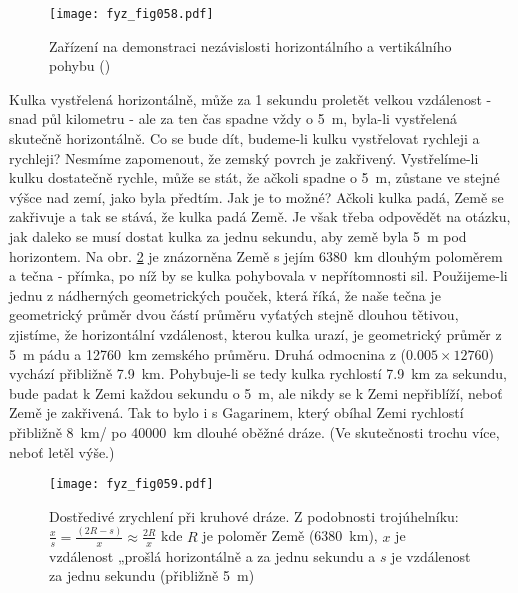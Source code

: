     \begin{figure}[ht!]  %
      \centering
      \texttt{[image: fyz\_fig058.pdf]}
      \caption{Zařízení na demonstraci nezávislosti horizontálního a vertikálního pohybu 
               (\cite[s.~96]{Feynman01})}
      \label{fyz:fig058}
    \end{figure}
    Kulka vystřelená horizontálně, může za \num{1} sekundu proletět velkou vzdálenost - snad půl 
    kilometru - ale za ten čas spadne vždy o \SI{5}{\m}, byla-li vystřelená skutečně horizontálně. 
    Co se bude dít, budeme-li kulku vystřelovat rychleji a rychleji? Nesmíme zapomenout, že zemský 
    povrch je zakřivený. Vystřelíme-li kulku dostatečně rychle, může se stát, že ačkoli spadne o 
    \SI{5}{\m}, zůstane ve stejné výšce nad zemí, jako byla předtím. Jak je to možné? Ačkoli kulka 
    padá, Země se zakřivuje a tak se stává, že kulka padá  Země. Je však třeba odpovědět 
    na otázku, jak daleko se musí dostat kulka za jednu sekundu, aby země byla \SI{5}{\m} pod 
    horizontem. Na obr. \ref{fyz:fig059} je znázorněna Země s jejím \SI{6380}{\km} dlouhým 
    poloměrem a tečna - přímka, po níž by se kulka pohybovala v nepřítomnosti sil. Použijeme-li 
    jednu z nádherných geometrických pouček, která říká, že naše tečna je geometrický průměr dvou 
    částí průměru vyťatých stejně dlouhou tětivou, zjistíme, že horizontální vzdálenost, kterou 
    kulka urazí, je geometrický průměr z \SI{5}{\m} pádu a \SI{12760}{\km} zemského průměru. Druhá 
    odmocnina z (\(\num{0.005}\times\num{12760}\)) vychází přibližně \SI{7.9}{\km}. Pohybuje-li se 
    tedy kulka rychlostí \SI{7.9}{\km} za sekundu, bude padat k Zemi každou sekundu o \SI{5}{\m}, 
    ale nikdy se k Zemi nepřiblíží, neboť Země je zakřivená. Tak to bylo i s Gagarinem, který 
    obíhal Zemi rychlostí přibližně \SI{8}{\km/\sec} po \SI{40000}{\km} dlouhé oběžné dráze. (Ve 
    skutečnosti trochu více, neboť letěl výše.)

    \begin{figure}[ht!]  %
      \centering
      \texttt{[image: fyz\_fig059.pdf]}
      \caption{Dostředivé zrychlení při kruhové dráze. Z podobnosti trojúhelníku: \(\frac{x}{s} = 
               \frac{(2R - s)}{x} \approx \frac{2R}{x}\) kde \(R\) je poloměr Země             
               (\SI{6380}{\km}), \(x\) je vzdálenost „prošlá horizontálně a za jednu sekundu a 
               \(s\) je vzdálenost  za jednu sekundu (přibližně \SI{5}{\m}) 
               \cite[s.~97]{Feynman01}}
       \label{fyz:fig059}
    \end{figure}
    
